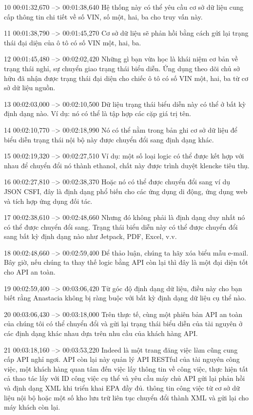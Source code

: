 10
00:01:32,670 --> 00:01:38,640
Hệ thống này có thể yêu cầu cơ sở dữ liệu cung cấp thông tin chi tiết về số VIN, số một, hai, ba cho truy vấn này.

11
00:01:38,790 --> 00:01:45,270
Cơ sở dữ liệu sẽ phản hồi bằng cách gửi lại trạng thái đại diện của ô tô có số VIN một, hai, ba.

12
00:01:45,480 --> 00:02:02,420
Những gì bạn vừa học là khái niệm cơ bản về trạng thái nghỉ, sự chuyển giao trạng thái biểu diễn.  Ứng dụng theo dõi chủ sở hữu đã nhận được trạng thái đại diện cho chiếc ô tô có số VIN một, hai, ba từ cơ sở dữ liệu nguồn.

13
00:02:03,000 --> 00:02:10,500
Dữ liệu trạng thái biểu diễn này có thể ở bất kỳ định dạng nào.  Ví dụ: nó có thể là tập hợp các cặp giá trị tên.

14
00:02:10,770 --> 00:02:18,990
Nó có thể nằm trong bản ghi cơ sở dữ liệu để biểu diễn trạng thái nội bộ này được chuyển đổi sang định dạng khác.

15
00:02:19,320 --> 00:02:27,510
Ví dụ: một số loại logic có thể được kết hợp với nhau để chuyển đổi nó thành ethanol, chất này được trình duyệt klencke tiêu thụ.

16
00:02:27,810 --> 00:02:38,370
Hoặc nó có thể được chuyển đổi sang ví dụ JSON CSFI, đây là định dạng phổ biến cho các ứng dụng di động, ứng dụng web và tích hợp ứng dụng đối tác.

17
00:02:38,610 --> 00:02:48,660
Nhưng đó không phải là định dạng duy nhất nó có thể được chuyển đổi sang.  Trạng thái biểu diễn này có thể được chuyển đổi sang bất kỳ định dạng nào như Jetpack, PDF, Excel, v.v.

18
00:02:48,660 --> 00:02:59,400
Để thảo luận, chúng ta hãy xóa biểu mẫu e-mail.  Bây giờ, nếu chúng ta thay thế logic bằng API còn lại thì đây là một đại diện tốt cho API an toàn.

19
00:02:59,400 --> 00:03:06,420
Từ góc độ định dạng dữ liệu, điều này cho bạn biết rằng Anastacia không bị ràng buộc với bất kỳ định dạng dữ liệu cụ thể nào.

20
00:03:06,430 --> 00:03:18,000
Trên thực tế, cùng một phiên bản API an toàn của chúng tôi có thể chuyển đổi và gửi lại trạng thái biểu diễn của tài nguyên ở các định dạng khác nhau dựa trên nhu cầu của khách hàng API.

21
00:03:18,160 --> 00:03:53,220
Indeed là một trang đăng việc làm cũng cung cấp API nghỉ ngơi.  API còn lại này quản lý API RESTful của tài nguyên công việc, một khách hàng quan tâm đến việc lấy thông tin về công việc, thực hiện tất cả thao tác lấy với ID công việc cụ thể và yêu cầu máy chủ API gửi lại phản hồi và định dạng XML khi triển khai EPA đầy đủ.  thông tin công việc từ cơ sở dữ liệu nội bộ hoặc một số kho lưu trữ liên tục chuyển đổi thành XML và gửi lại cho máy khách còn lại.

